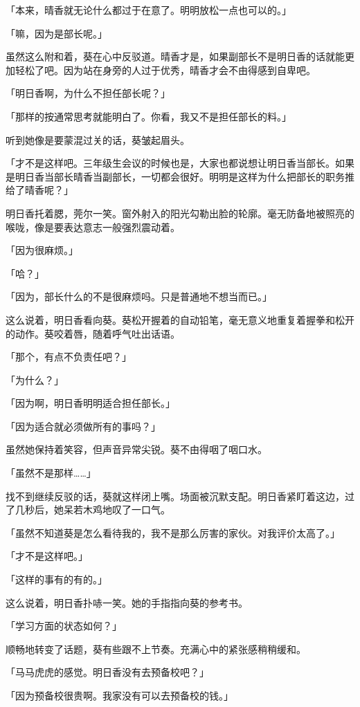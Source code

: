 \documentclass[UTF8]{ctexart}
\begin{document}
    「本来，晴香就无论什么都过于在意了。明明放松一点也可以的。」

    「嘛，因为是部长呢。」

    虽然这么附和着，葵在心中反驳道。晴香才是，如果副部长不是明日香的话就能更加轻松了吧。因为站在身旁的人过于优秀，晴香才会不由得感到自卑吧。

    「明日香啊，为什么不担任部长呢？」

    「那样的按通常思考就能明白了。你看，我又不是担任部长的料。」

    听到她像是要蒙混过关的话，葵皱起眉头。

    「才不是这样吧。三年级生会议的时候也是，大家也都说想让明日香当部长。如果是明日香当部长晴香当副部长，一切都会很好。明明是这样为什么把部长的职务推给了晴香呢？」

    明日香托着腮，莞尔一笑。窗外射入的阳光勾勒出脸的轮廓。毫无防备地被照亮的喉咙，像是要表达意志一般强烈震动着。

    「因为很麻烦。」

    「哈？」

    「因为，部长什么的不是很麻烦吗。只是普通地不想当而已。」

    这么说着，明日香看向葵。葵松开握着的自动铅笔，毫无意义地重复着握拳和松开的动作。葵咬着唇，随着呼气吐出话语。

    「那个，有点不负责任吧？」

    「为什么？」

    「因为啊，明日香明明适合担任部长。」

    「因为适合就必须做所有的事吗？」

    虽然她保持着笑容，但声音异常尖锐。葵不由得咽了咽口水。

    「虽然不是那样……」

    找不到继续反驳的话，葵就这样闭上嘴。场面被沉默支配。明日香紧盯着这边，过了几秒后，她呆若木鸡地叹了一口气。

    「虽然不知道葵是怎么看待我的，我不是那么厉害的家伙。对我评价太高了。」

    「才不是这样吧。」

    「这样的事有的有的。」

    这么说着，明日香扑哧一笑。她的手指指向葵的参考书。

    「学习方面的状态如何？」

    顺畅地转变了话题，葵有些跟不上节奏。充满心中的紧张感稍稍缓和。

    「马马虎虎的感觉。明日香没有去预备校吧？」

    「因为预备校很贵啊。我家没有可以去预备校的钱。」
\end{document}
